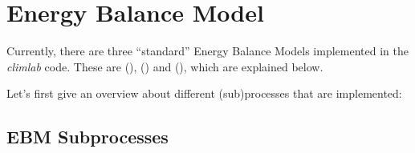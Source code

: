 \documentclass[a4paper,10pt,english]{sphinxmanual}
\begin{document}
\section{Energy Balance Model}
\label{models:energy-balance-model}
Currently, there are three ``standard'' Energy Balance Models implemented in the \emph{climlab} code.
These are {\hyperref[api/climlab.model:climlab.model.ebm.EBM]{\emph{}}} (), {\hyperref[api/climlab.model:climlab.model.ebm.EBM_seasonal]{\emph{}}} () and {\hyperref[api/climlab.model:climlab.model.ebm.EBM_annual]{\emph{}}} (), which are explained below.

Let's first give an overview about different (sub)processes that are implemented:


\subsection{EBM Subprocesses}
\label{models:ebm-subprocesses}
\end{document}
